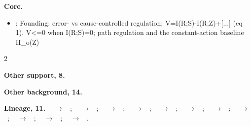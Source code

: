 \documentclass[10pt]{article}
\newcommand{\memb}[1]{\par\smallskip\textbf{#1}\quad}
\begin{document}
\memb{Core.}
\begin{itemize}[nosep,leftmargin=1.2em]
\item \citet{Conant-information69}: Founding: error- vs cause-controlled regulation; V=I(R;S)-I(R;Z)+[...] (eq 1), V\textless{}=0 when I(R;S)=0; path regulation and the constant-action baseline H\_o(Z)
\end{itemize}
\begin{multicols}{2}
\memb{Other support, 8.} \citetext{\citealp{Conant-laws76}; \citealp{Jones-entropy76}; \citealp{Engell-information85}; \citealp{Saridis-entropy88}; \citealp{Musgrave-entropy89}; \citealp{Ashby-requisite91}; \citealp{Boyd-leveraging16}; \citealp{Siegenfeld-formal22}}

\memb{Other background, 14.} {\footnotesize \citetext{\citealp{Porter-requisite76}; \citealp{Sahal-principles78}; \citealp{deRaadt-models88}; \citealp{Tsai-discrete92}; \citealp{Glanville-variety94}; \citealp{Conant-information96}; \citealp{Chen-new02}; \citealp{Andrew-requisite09}; \citealp{Gershenson-requisite15}; \citealp{Girolami-towards15}; \citealp{Mahmoodi-complexity18}; \citealp{Aliman-requisite19}; \citealp{Bertoni-law22}; \citealp{ORourke-llm26}}}

\end{multicols}
\memb{Lineage, 11.} {\footnotesize \citeauthor{Ashby-introduction56}~\citeyear{Ashby-introduction56} $\to$ \citeauthor{Conant-information69}~\citeyear{Conant-information69}; \citeauthor{Ashby-introduction56}~\citeyear{Ashby-introduction56} $\to$ \citeauthor{Boyd-leveraging16}~\citeyear{Boyd-leveraging16}; \citeauthor{Ashby-introduction56}~\citeyear{Ashby-introduction56} $\to$ \citeauthor{Siegenfeld-formal22}~\citeyear{Siegenfeld-formal22}; \citeauthor{Conant-information69}~\citeyear{Conant-information69} $\to$ \citeauthor{Conant-good70}~\citeyear{Conant-good70}; \citeauthor{Conant-information69}~\citeyear{Conant-information69} $\to$ \citeauthor{Conant-laws76}~\citeyear{Conant-laws76}; \citeauthor{Conant-information69}~\citeyear{Conant-information69} $\to$ \citeauthor{Jones-entropy76}~\citeyear{Jones-entropy76}; \citeauthor{Weidemann-entropy69}~\citeyear{Weidemann-entropy69} $\to$ \citeauthor{Jones-entropy76}~\citeyear{Jones-entropy76}; \citeauthor{Conant-information69}~\citeyear{Conant-information69} $\to$ \citeauthor{Engell-information85}~\citeyear{Engell-information85}; \citeauthor{Conant-laws76}~\citeyear{Conant-laws76} $\to$ \citeauthor{Saridis-entropy88}~\citeyear{Saridis-entropy88}; \citeauthor{Engell-information85}~\citeyear{Engell-information85} $\to$ \citeauthor{Zhang-bode03}~\citeyear{Zhang-bode03}; \citeauthor{Saridis-entropy88}~\citeyear{Saridis-entropy88} $\to$ \citeauthor{Touchette-information04}~\citeyear{Touchette-information04}.}
\end{document}
